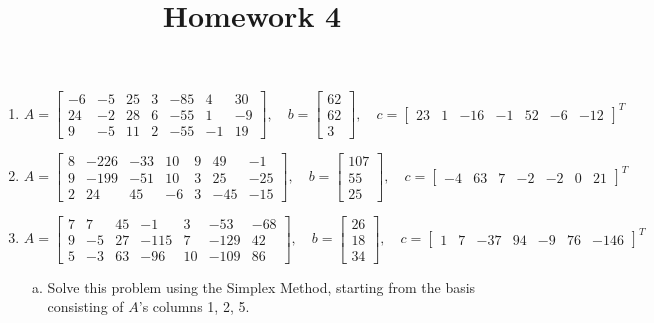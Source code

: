 \documentclass{article}
\begin{document}
\title{Homework 4}
\maketitle
\thispagestyle{fancy}

\begin{enumerate}[1:]
	\item \[A=\begin{bmatrix}
				-6 & -5 & 25 & 3 & -85 & 4 & 30 \\
				24 & -2 & 28 & 6 & -55 & 1 & -9 \\
				9 & -5 & 11 & 2 & -55 & -1 & 19
			\end{bmatrix}, \quad b=\begin{bmatrix}
				62 \\ 62 \\ 3
			\end{bmatrix}, \quad c= \begin{bmatrix}
				23 & 1 & -16 & -1 & 52 & -6 & -12
		\end{bmatrix}^T\] 
		

	\item \[A=\begin{bmatrix}
				8 & -226 & -33 & 10 & 9 & 49 & -1 \\
				9 & -199 & -51 & 10 & 3 & 25 & -25 \\
				2 & 24 & 45 & -6 & 3 & -45 & -15
			\end{bmatrix}, \quad b=\begin{bmatrix}
				107 \\ 55 \\ 25
			\end{bmatrix}, \quad c=\begin{bmatrix}
				-4 & 63 & 7 & -2 & -2 & 0 & 21
		\end{bmatrix}^T\] 
		

		\newpage
	\item \[A=\begin{bmatrix}
				7 & 7 & 45 & -1 & 3 & -53 & -68 \\
				9 & -5 & 27 &  -115 & 7 & -129 & 42 \\
				5 & -3 & 63 & -96 & 10 & -109 & 86
			\end{bmatrix}, \quad b=\begin{bmatrix}
				26 \\ 18 \\ 34
			\end{bmatrix}, \quad c=\begin{bmatrix}
				1 & 7 & -37 & 94 & -9 & 76 & -146
		\end{bmatrix}^T\]
		\begin{enumerate}[a)]
			\item Solve this problem using the Simplex Method, starting from the basis consisting of $A$'s columns 1, 2, 5.
				


\end{enumerate}
\end{enumerate}
\end{document}
